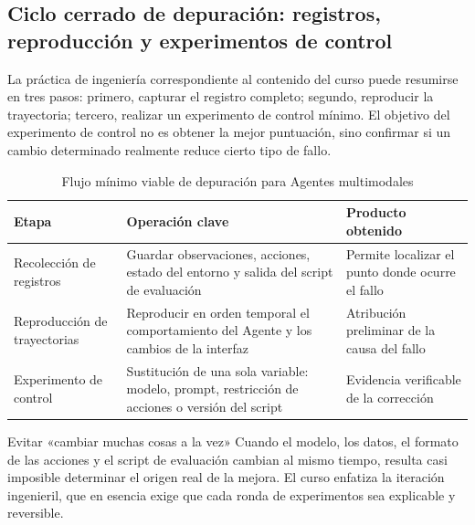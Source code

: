 \documentclass[a4paper]{article}
\begin{document}
\subsection{Ciclo cerrado de depuración: registros, reproducción y experimentos de control}
La práctica de ingeniería correspondiente al contenido del curso puede resumirse en tres pasos: primero, capturar el registro completo; segundo, reproducir la trayectoria; tercero, realizar un experimento de control mínimo. El objetivo del experimento de control no es obtener la mejor puntuación, sino confirmar si un cambio determinado realmente reduce cierto tipo de fallo.

\begin{table}[H]
\centering
\begin{tabular}{p{2.6cm}p{4.6cm}p{4.0cm}}
\toprule
\textbf{Etapa} & \textbf{Operación clave} & \textbf{Producto obtenido} \\
\midrule
Recolección de registros & Guardar observaciones, acciones, estado del entorno y salida del script de evaluación & Permite localizar el punto donde ocurre el fallo \\
Reproducción de trayectorias & Reproducir en orden temporal el comportamiento del Agente y los cambios de la interfaz & Atribución preliminar de la causa del fallo \\
Experimento de control & Sustitución de una sola variable: modelo, prompt, restricción de acciones o versión del script & Evidencia verificable de la corrección \\
\bottomrule
\end{tabular}
\caption{Flujo mínimo viable de depuración para Agentes multimodales}
\end{table}

\begin{warningbox}{Evitar «cambiar muchas cosas a la vez»}
Cuando el modelo, los datos, el formato de las acciones y el script de evaluación cambian al mismo tiempo, resulta casi imposible determinar el origen real de la mejora. El curso enfatiza la iteración ingenieril, que en esencia exige que cada ronda de experimentos sea explicable y reversible.
\end{warningbox}
\end{document}
